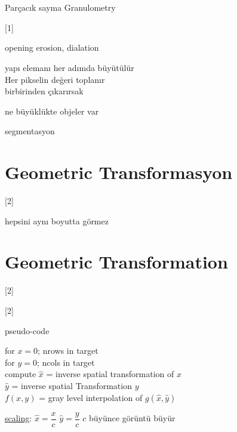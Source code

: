 \documentclass[11pt,a4paper]{article}
\begin{document}

\section{\okunamadi{}}
Parçacık sayma \hfill Granulometry

[1]

opening erosion, dialation


yapı elemanı her adımda büyütülür \\
Her pikselin değeri toplanır \\
birbirinden çıkarırsak

ne büyüklükte objeler var

 segmentasyon

\section{Geometric Transformasyon}
[2]

hepsini aynı boyutta görmez

\section{Geometric Transformation}
[2]

[2]

pseudo-code

for $x=0$; nrows in target \\
\hspace*{1.5em} for $y=0$; ncols in target \\
\hspace*{3em} compute $\hat{x}$ = inverse spatial transformation of $x$ \\
\hspace*{3em} $\hat{y}$ = inverse spatial Transformation $y$ \\
\hspace*{3em} $f(x,y)$ = gray level interpolation of $g(\hat{x},\hat{y})$

\underline{scaling}: \quad $\hat{x}=\dfrac{x}{c}$ \qquad\quad $\hat{y}=\dfrac{y}{c}$ \hfill {\small $c$ büyünce görüntü büyür}
\end{document}
